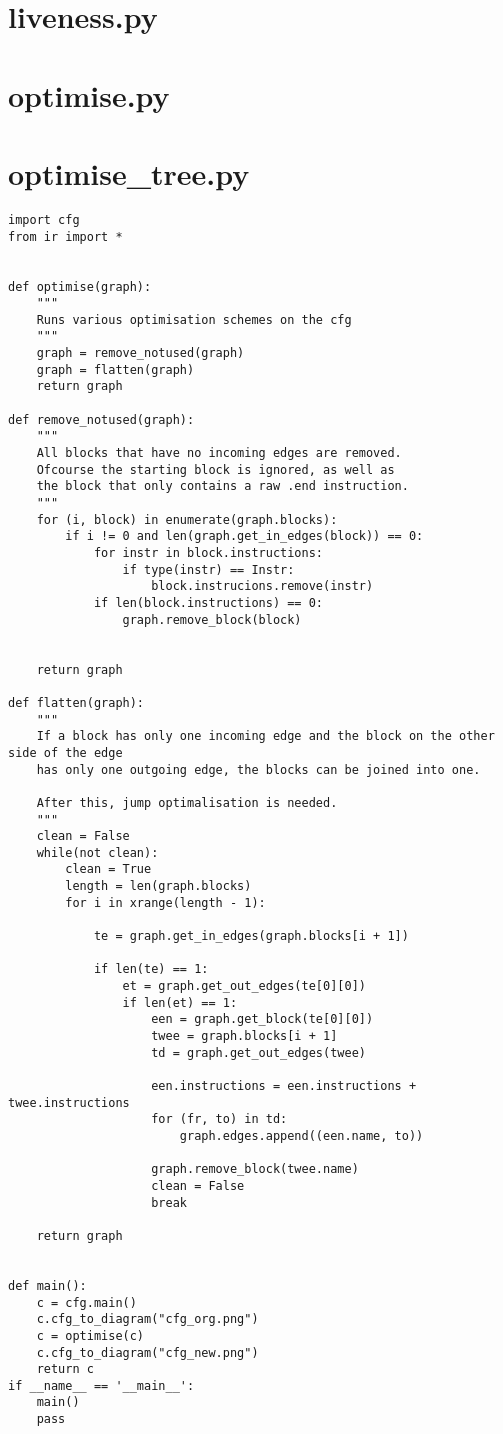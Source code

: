 \section{liveness.py}


\newpage
\section{optimise.py}


\newpage
\section{optimise\_tree.py}
%
\begin{lstlisting}
import cfg
from ir import *


def optimise(graph):
    """
    Runs various optimisation schemes on the cfg
    """
    graph = remove_notused(graph)
    graph = flatten(graph)
    return graph

def remove_notused(graph):
    """
    All blocks that have no incoming edges are removed.
    Ofcourse the starting block is ignored, as well as
    the block that only contains a raw .end instruction.
    """
    for (i, block) in enumerate(graph.blocks):
        if i != 0 and len(graph.get_in_edges(block)) == 0:
            for instr in block.instructions:
                if type(instr) == Instr:
                    block.instrucions.remove(instr)
            if len(block.instructions) == 0:
                graph.remove_block(block)
            
                
    return graph

def flatten(graph):
    """
    If a block has only one incoming edge and the block on the other side of the edge
    has only one outgoing edge, the blocks can be joined into one.

    After this, jump optimalisation is needed.
    """
    clean = False
    while(not clean):
        clean = True
        length = len(graph.blocks)
        for i in xrange(length - 1):
            
            te = graph.get_in_edges(graph.blocks[i + 1])
            
            if len(te) == 1:
                et = graph.get_out_edges(te[0][0])
                if len(et) == 1:
                    een = graph.get_block(te[0][0])
                    twee = graph.blocks[i + 1]
                    td = graph.get_out_edges(twee)

                    een.instructions = een.instructions + twee.instructions
                    for (fr, to) in td:
                        graph.edges.append((een.name, to))

                    graph.remove_block(twee.name)
                    clean = False
                    break

    return graph


def main():
    c = cfg.main()
    c.cfg_to_diagram("cfg_org.png")
    c = optimise(c)
    c.cfg_to_diagram("cfg_new.png")
    return c
if __name__ == '__main__':
    main()
    pass
\end{lstlisting}
\newpage
